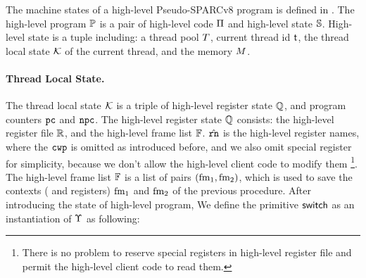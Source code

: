 The machine states of a high-level Pseudo-SPARCv8 program 
is defined in \Fig{\ref{fig:machine-state-concur-pseudo-sparc}}. 
The high-level program $\mathbb{P}$ is a pair of high-level code 
$\Pi$ and high-level state $\mathbb{S}$. High-level 
state is a tuple including: a thread pool $T$, 
current thread id $\textsf{t}$, the thread local state 
$\mathcal{K}$ of the current thread, and the memory $M$.

\paragraph{\textbf{Thread Local State.}} 
The thread local state $\mathcal{K}$ 
is a triple of high-level register state $\mathbb{Q}$, 
and program counters $\texttt{pc}$ and $\texttt{npc}$. The high-level 
register state $\mathbb{Q}$ consists: 
the high-level register file $\mathbb{R}$, 
and the high-level frame list $\mathbb{F}$. 
$\hat{\texttt{rn}}$ is the high-level register names, where 
the $\texttt{cwp}$ is omitted as introduced before,  and 
we also omit special register for simplicity, 
because we don't allow 
the high-level client code to modify them
\footnote{There is no problem to reserve special 
registers in high-level register file and permit
the high-level client code to read them.}. 
The high-level frame list $\mathbb{F}$ is a list of pairs 
$(\text{fm}_1, \text{fm}_2)$, which is used to save 
the contexts (\localRN{} and \inRN{} registers) 
$\text{fm}_1$ and $\text{fm}_2$ of the previous procedure.
After introducing the state of high-level program, 
We define the primitive $\mathsf{switch}$ as 
an instantiation of $\Upsilon$ as following: 
